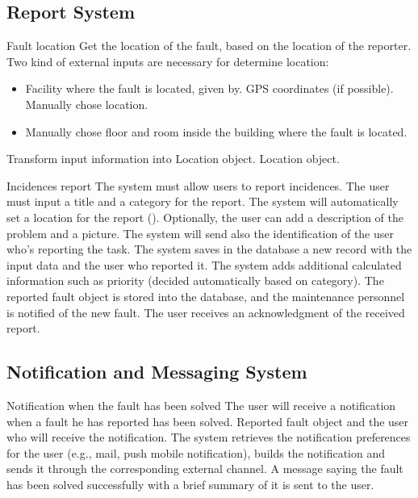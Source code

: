 \subsection{Report System}

\begin{requirement}{Fault location}
\label{reqFaultLocation}
\reqdesc Get the location of the fault, based on the location of the reporter.
\reqin Two kind of external inputs are necessary for determine location:
\begin{itemize}
\item Facility where the fault is located, given by.
\subitem GPS coordinates (if possible).
\subitem Manually chose location.
\item Manually chose floor and room inside the building where the fault is located.
\end{itemize}
\reqsteps Transform input information into Location object.
\reqout Location object.
\end{requirement}

\begin{requirement}{Incidences report}
\reqdesc The system must allow users to report incidences.
\reqin The user must input a title and a category for the report. The system will automatically set a location for the report (). Optionally, the user can add a description of the problem and a picture. The system will send also the identification of the user who's reporting the task.
\reqsteps The system saves in the database a new record with the input data and the user who reported it. The system adds additional calculated information such as priority (decided automatically based on category).
\reqout The reported fault object is stored into the database, and the maintenance personnel is notified of the new fault. The user receives an acknowledgment of the received report.
\end{requirement}

\subsection{Notification and Messaging System}

\begin{requirement}{Notification when the fault has been solved}
\reqdesc The user will receive a notification when a fault he has reported has been solved.
\reqin Reported fault object and the user who will receive the notification.
\reqsteps The system retrieves the notification preferences for the user (e.g., mail, push mobile notification), builds the notification and sends it through the corresponding external channel.
\reqout A message saying the fault has been solved successfully with a brief summary of it is sent to the user.
\end{requirement}

